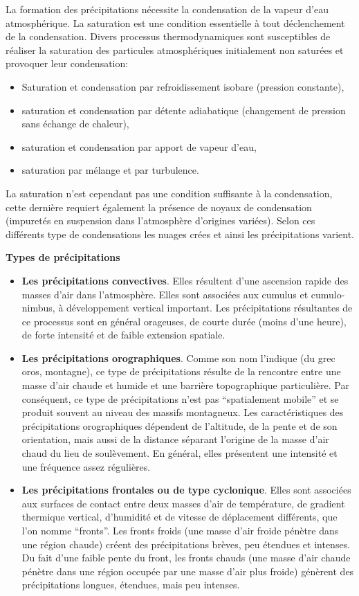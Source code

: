\documentclass[a4paper,11pt]{article}
\numberwithin{equation}{section}
\begin{document}
La formation des précipitations nécessite la condensation de la vapeur d'eau atmosphérique. La saturation est une condition essentielle à tout déclenchement de la condensation. Divers processus thermodynamiques sont susceptibles de réaliser la saturation des particules atmosphériques initialement non saturées et provoquer leur condensation:

\begin{itemize}
	\item Saturation et condensation par refroidissement isobare (pression constante),
	\item saturation et condensation par détente adiabatique (changement de pression sans échange de chaleur),
	\item saturation et condensation par apport de vapeur d'eau,
	\item saturation par mélange et par turbulence.
\end{itemize}
La saturation n'est cependant pas une condition suffisante à la condensation, cette dernière requiert également la présence de noyaux de condensation (impuretés en suspension dans l'atmosphère d'origines variées). Selon ces différents type de condensations les nuages crées et ainsi les précipitations varient.

\vspace{0.7cm}

\noindent \textbf{Types de précipitations}

\begin{itemize}
	\item \textbf{Les précipitations convectives}. Elles résultent d'une ascension rapide des masses d'air dans l'atmosphère. Elles sont associées aux cumulus et cumulo-nimbus, à développement vertical important. Les précipitations résultantes de ce processus sont en général orageuses, de courte durée (moins d'une heure), de forte intensité et de faible extension spatiale.
	\item \textbf{Les précipitations orographiques}. Comme son nom l'indique (du grec oros, montagne), ce type de précipitations résulte de la rencontre entre une masse d'air chaude et humide et une barrière topographique particulière. Par conséquent, ce type de précipitations n’est pas ``spatialement mobile'' et se produit souvent au niveau des massifs montagneux. Les caractéristiques des précipitations orographiques dépendent de l'altitude, de la pente et de son orientation, mais aussi de la distance séparant l'origine de la masse d'air chaud du lieu de soulèvement. En général, elles présentent une intensité et une fréquence assez régulières.
	\item \textbf{Les précipitations frontales ou de type cyclonique}. Elles sont associées aux surfaces de contact entre deux masses d'air de température, de gradient thermique vertical, d'humidité et de vitesse de déplacement différents, que l'on nomme ``fronts''. Les fronts froids (une masse d’air froide pénètre dans une région chaude) créent des précipitations brèves, peu étendues et intenses. Du fait d’une faible pente du front, les fronts chauds (une masse d’air chaude pénètre dans une région occupée par une masse d’air plus froide) génèrent des précipitations longues, étendues, mais peu intenses.
\end{itemize}
\end{document}
